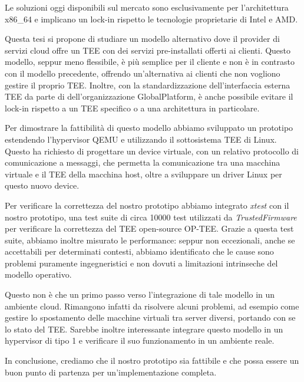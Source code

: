 \documentclass[12pt,italian]{report}
\begin{document}
Le soluzioni oggi disponibili sul mercato sono esclusivamente per
l'architettura x86\_64 e implicano un lock-in rispetto le tecnologie
proprietarie di Intel e AMD.

Questa tesi si propone di studiare un modello alternativo dove il provider
di servizi cloud offre un TEE con dei servizi pre-installati offerti ai
clienti.
Questo modello, seppur meno flessibile, è più semplice per il cliente e non
è in contrasto con il modello precedente, offrendo un'alternativa
ai clienti che non vogliono gestire il proprio TEE.
Inoltre, con la standardizzazione dell'interfaccia esterna TEE da parte di
dell'organizzazione GlobalPlatform\cite{gp2020clientapi}, è anche possibile
evitare il lock-in rispetto a un TEE specifico o a una
architettura in particolare.

Per dimostrare la fattibilità di questo modello abbiamo sviluppato un
prototipo estendendo l'hypervisor QEMU e utilizzando il sottosistema
TEE di Linux\cite{linux_tee_subsystem}.
Questo ha richiesto di progettare un device virtuale, con un relativo
protocollo di comunicazione a messaggi, che permetta la comunicazione
tra una macchina virtuale e il TEE della macchina host, oltre a
sviluppare un driver Linux per questo nuovo device.

Per verificare la correttezza del nostro prototipo abbiamo integrato
\textit{xtest}\cite{xtest} con il nostro prototipo, una test suite di
circa 10000 test
utilizzati da \textit{TrustedFirmware} per verificare la correttezza del
TEE open-source OP-TEE.
Grazie a questa test suite, abbiamo inoltre misurato le performance: 
seppur non eccezionali, anche se accettabili per determinati contesti,
abbiamo identificato che le cause sono problemi puramente ingegneristici e
non dovuti a limitazioni intrinseche del modello operativo.

\medbreak

Questo non è che un primo passo verso l'integrazione di tale modello in un
ambiente cloud.
Rimangono infatti da risolvere alcuni problemi, ad esempio come gestire
lo spostamento delle macchine virtuali tra server diversi, portando con
se lo stato del TEE. 
Sarebbe inoltre interessante integrare questo modello in un hypervisor di
tipo 1 e verificare il suo funzionamento in un ambiente reale. 

In conclusione, crediamo che il nostro prototipo sia fattibile e che possa
essere un buon punto di partenza per un'implementazione completa.



\end{document}
